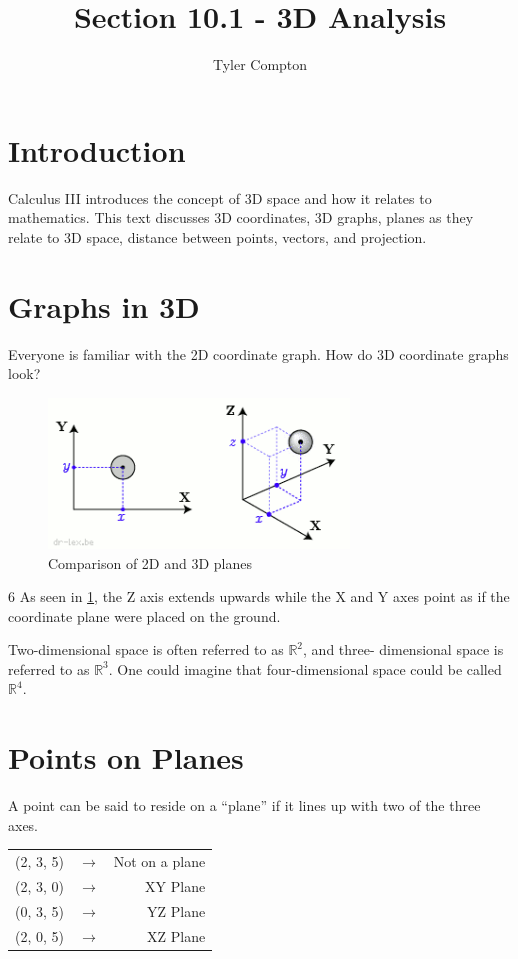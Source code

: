 \documentclass{article}
\author{Tyler Compton}
\title{Section 10.1 - 3D Analysis}
\begin{document}
\maketitle
\tableofcontents

\section{Introduction}
Calculus \textrm{III} introduces the concept of 3D space and how it relates to
mathematics. This text discusses 3D coordinates, 3D graphs, planes as they
relate to 3D space, distance between points, vectors, and projection.

\section{Graphs in 3D}
Everyone is familiar with the 2D coordinate graph. How do 3D coordinate graphs
look?

\begin{figure}[H]
	\centering
	\includegraphics[width=8cm]{2d-vs-3d-planes}
	\caption{Comparison of 2D and 3D planes}
	\label{fig:planes}
\end{figure}
6
As seen in \ref{fig:planes}, the Z axis extends upwards while the X and Y axes
point as if the coordinate plane were placed on the ground.

Two-dimensional space is often referred to as $\mathbb{R}^2$, and three-
dimensional space is referred to as $\mathbb{R}^3$. One could imagine that
four-dimensional space could be called $\mathbb{R}^4$.

\section{Points on Planes}
A point can be said to reside on a ``plane'' if it lines up with two of the
three axes.

\begin{table}[H]
	\centering
	\begin{tabular}{ l c r }
		(2, 3, 5) & $\rightarrow$ & Not on a plane \\
		(2, 3, 0) & $\rightarrow$ & XY Plane \\
		(0, 3, 5) & $\rightarrow$ & YZ Plane \\
		(2, 0, 5) & $\rightarrow$ & XZ Plane \\
	\end{tabular}
\end{table}
\end{document}
